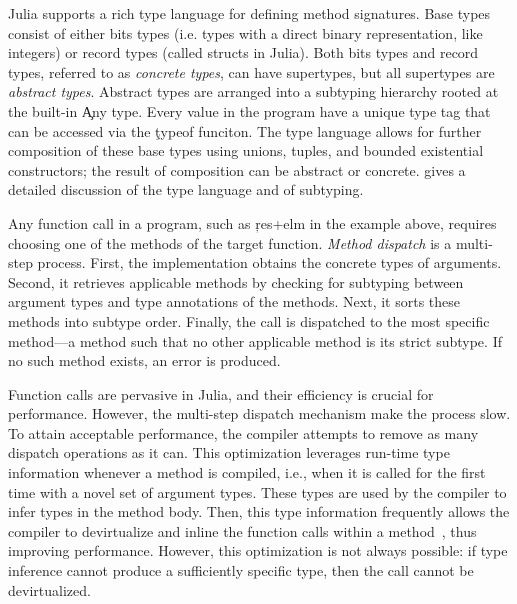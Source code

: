 \documentclass[sigplan,review,anonymous]{acmart}
\begin{document}


Julia supports a rich type language for defining method signatures. Base types
consist of either bits types (i.e. types with a direct binary representation,
like integers) or record types (called structs in Julia). Both bits types and
record types, referred to as \emph{concrete types}, can have supertypes, but all
supertypes are \emph{abstract types}. Abstract types are arranged into a
subtyping hierarchy rooted at the built-in \c{Any} type. Every value in the
program have a unique type tag that can be accessed via the \c{typeof} funciton.
%
The type language allows for further composition of these base
types using unions, tuples, and bounded existential constructors; the result of
composition can be abstract or concrete. \citet{oopsla18b} gives a detailed
discussion of the type language and of subtyping.

Any function call in a program, such as \c{res+elm} in the example above,
requires choosing one of the methods of the target function. \emph{Method
dispatch} is a multi-step process. First, the implementation obtains the
concrete types of arguments. Second, it retrieves applicable methods by checking
for subtyping between argument types and type annotations of the methods. Next,
it sorts these methods into subtype order. Finally, the call is dispatched to
the most specific method---a method such that no other applicable method is its
strict subtype. If no such method exists, an error is produced.

Function calls are pervasive in Julia, and their efficiency is crucial for
performance. However, the multi-step dispatch mechanism
make the process slow. To attain acceptable performance, the compiler attempts
to remove as many dispatch operations as it can. This optimization leverages
run-time type information whenever a method is compiled, i.e., when it is called
for the first time with a novel set of argument types.  These types are used by
the compiler to infer types in the method body. Then, this type information
frequently allows the compiler to devirtualize and inline the function calls
within a method~\cite{aigner}, thus improving performance. However, this
optimization is not always possible: if type inference cannot produce a
sufficiently specific type, then the call cannot be devirtualized.
\end{document}
